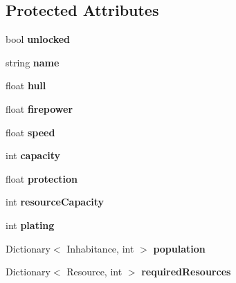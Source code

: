 \subsection*{Protected Attributes}
\begin{DoxyCompactItemize}
\item 
\hypertarget{class_ship_ab9430db4eda75ef7ec77f5f7ff1b9bdd}{}bool {\bfseries unlocked}\label{class_ship_ab9430db4eda75ef7ec77f5f7ff1b9bdd}

\item 
\hypertarget{class_ship_a1ff0d583487e03928204095baa86c942}{}string {\bfseries name}\label{class_ship_a1ff0d583487e03928204095baa86c942}

\item 
\hypertarget{class_ship_ae1e8efa4b9a74c4840b895381ade8aa5}{}float {\bfseries hull}\label{class_ship_ae1e8efa4b9a74c4840b895381ade8aa5}

\item 
\hypertarget{class_ship_aaee623b717517fe78d7b7df63cbac657}{}float {\bfseries firepower}\label{class_ship_aaee623b717517fe78d7b7df63cbac657}

\item 
\hypertarget{class_ship_afdbbfbe108985ec9575440ad268cd00f}{}float {\bfseries speed}\label{class_ship_afdbbfbe108985ec9575440ad268cd00f}

\item 
\hypertarget{class_ship_a0b302cc2af0e84ea0778e09024b016df}{}int {\bfseries capacity}\label{class_ship_a0b302cc2af0e84ea0778e09024b016df}

\item 
\hypertarget{class_ship_ae000b41ada157293d5f19bb27bc647b9}{}float {\bfseries protection}\label{class_ship_ae000b41ada157293d5f19bb27bc647b9}

\item 
\hypertarget{class_ship_a47481b067e6f06c6ae3934a4b8c752aa}{}int {\bfseries resource\+Capacity}\label{class_ship_a47481b067e6f06c6ae3934a4b8c752aa}

\item 
\hypertarget{class_ship_a8634a5d5b303ca88e3f07cee57cd65a1}{}int {\bfseries plating}\label{class_ship_a8634a5d5b303ca88e3f07cee57cd65a1}

\item 
\hypertarget{class_ship_a3cfea075b9e5efb98262a14492181ca5}{}Dictionary$<$ Inhabitance, int $>$ {\bfseries population}\label{class_ship_a3cfea075b9e5efb98262a14492181ca5}

\item 
\hypertarget{class_ship_a3f67d530ff6b2d59bbd3f5c922432514}{}Dictionary$<$ Resource, int $>$ {\bfseries required\+Resources}\label{class_ship_a3f67d530ff6b2d59bbd3f5c922432514}


\end{DoxyCompactItemize}
